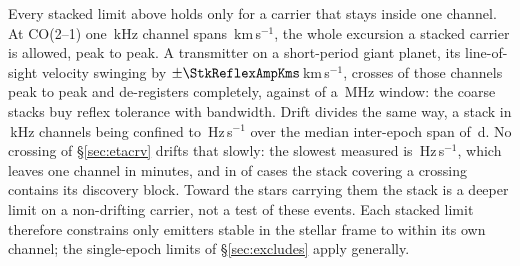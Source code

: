 Every stacked limit above holds only for a carrier that stays inside one
channel. At CO(2--1) one \StkRefChanKHz\,kHz channel spans
\StkTolFineKms\,km\,s$^{-1}$, the whole excursion a stacked carrier is
allowed, peak to peak. A transmitter on a short-period giant planet, its
line-of-sight velocity swinging by
$\pm\StkReflexAmpKms$\,km\,s$^{-1}$, crosses \SzReflexPPChanFine{} of those
channels peak to peak and de-registers completely, against
\SzReflexPPChanCoarse{} of a \ChanBModeMHz\,MHz window: the coarse
stacks buy reflex tolerance with bandwidth. Drift divides the same way, a
stack in \StkRefChanKHz\,kHz channels being confined to
\StkDriftTolHzS\,Hz\,s$^{-1}$ over the median inter-epoch span of
\StkSpanMedD\,d. No crossing of \S\ref{sec:etacrv} drifts that slowly: the
slowest measured is \SttDriftMinHzS\,Hz\,s$^{-1}$, which leaves one channel in
\SttDriftMinMin{} minutes, and in \SttNIncDisc{} of \NUnattributed{} cases the
stack covering a crossing contains its discovery block. Toward the
\SttNHostStar{} stars carrying them the stack is a deeper limit on a
non-drifting carrier, not a test of these events. Each
stacked limit therefore constrains only emitters stable in the stellar frame to
within its own channel; the single-epoch limits of \S\ref{sec:excludes} apply
generally.
